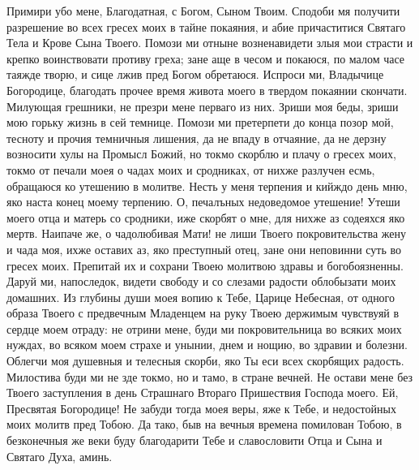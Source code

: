 \begin{mymulticols}
Примири убо мене, Благодатная, с Богом, Сыном Твоим. Сподоби мя получити разрешение во всех гресех моих в тайне покаяния, и абие причаститися Святаго Тела и Крове Сына Твоего. Помози ми отныне возненавидети злыя мои страсти и крепко воинствовати противу греха; зане аще в чесом и покаюся, по малом часе таяжде творю, и сице лжив пред Богом обретаюся. Испроси ми, Владычице Богородице, благодать прочее время живота моего в твердом покаянии скончати. Милующая грешники, не презри мене перваго из них. Зриши моя беды, зриши мою горьку жизнь в сей темнице. Помози ми претерпети до конца позор мой, тесноту и прочия темничныя лишения, да не впаду в отчаяние, да не дерзну возносити хулы на Промысл Божий, но токмо скорблю и плачу о гресех моих, токмо от печали моея о чадах моих и сродниках, от нихже разлучен есмь, обращаюся ко утешению в молитве. Несть у меня терпения и кийждо день мню, яко наста конец моему терпению. О, печалъных недоведомое утешение! Утеши моего отца и матерь со сродники, иже скорбят о мне, для нихже аз содеяхся яко мертв. Наипаче же, о чадолюбивая Мати! не лиши Твоего покровительства жену и чада моя, ихже оставих аз, яко преступный отец, зане они неповинни суть во гресех моих. Препитай их и сохрани Твоею молитвою здравы и богобоязненны. Даруй ми, напоследок, видети свободу и со слезами радости облобызати моих домашних. Из глубины души моея вопию к Тебе, Царице Небесная, от одного образа Твоего с предвечным Младенцем на руку Твоею держимым чувствуяй в сердце моем отраду: не отрини мене, буди ми покровительница во всяких моих нуждах, во всяком моем страхе и унынии, днем и нощию, во здравии и болезни. Облегчи моя душевныя и телесныя скорби, яко Ты еси всех скорбящих радость. Милостива буди ми не зде токмо, но и тамо, в стране вечней. Не остави мене без Твоего заступления в день Страшнаго Втораго Пришествия Господа моего. Ей, Пресвятая Богородице! Не забуди тогда моея веры, яже к Тебе, и недостойных моих молитв пред Тобою. Да тако, быв на вечныя времена помилован Тобою, в безконечныя же веки буду благодарити Тебе и славословити Отца и Сына и Святаго Духа, аминь. 

\end{mymulticols}

\mychapterending

 

{\centering{}

}

